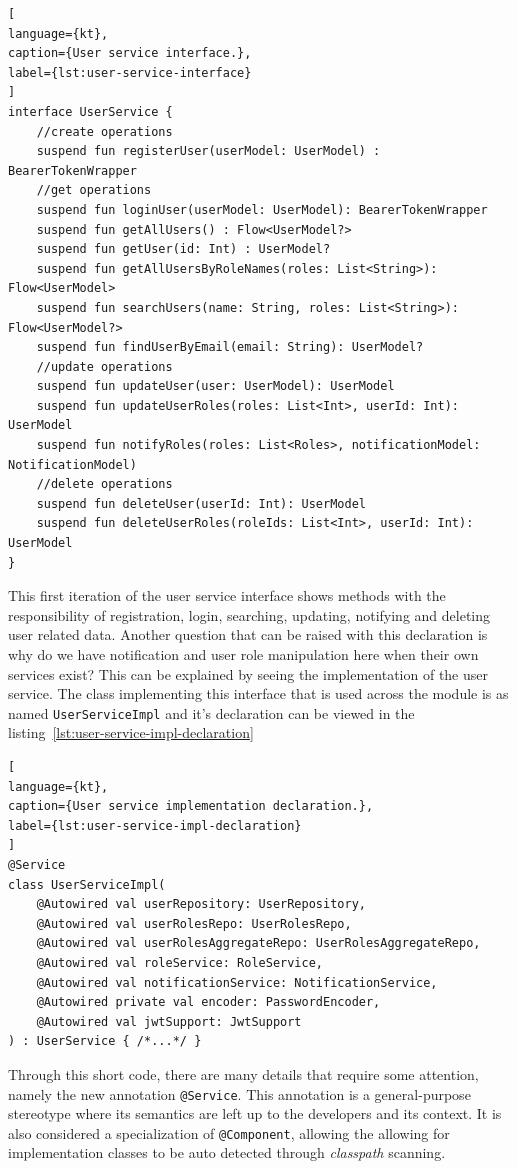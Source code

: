 \begin{lstlisting}[
language={kt},
caption={User service interface.},
label={lst:user-service-interface}
]
interface UserService {
    //create operations
    suspend fun registerUser(userModel: UserModel) : BearerTokenWrapper
    //get operations
    suspend fun loginUser(userModel: UserModel): BearerTokenWrapper
    suspend fun getAllUsers() : Flow<UserModel?>
    suspend fun getUser(id: Int) : UserModel?
    suspend fun getAllUsersByRoleNames(roles: List<String>): Flow<UserModel>
    suspend fun searchUsers(name: String, roles: List<String>): Flow<UserModel?>
    suspend fun findUserByEmail(email: String): UserModel?
    //update operations
    suspend fun updateUser(user: UserModel): UserModel
    suspend fun updateUserRoles(roles: List<Int>, userId: Int): UserModel
    suspend fun notifyRoles(roles: List<Roles>, notificationModel: NotificationModel)
    //delete operations
    suspend fun deleteUser(userId: Int): UserModel
    suspend fun deleteUserRoles(roleIds: List<Int>, userId: Int): UserModel
}
\end{lstlisting}

This first iteration of the user service interface shows methods with the responsibility of registration, login, searching, updating, notifying and deleting user related data.
Another question that can be raised with this declaration is why do we have notification and user role manipulation here when their own services exist? This can be explained by seeing the implementation of the user service. The class implementing this interface that is used across the module is as named \lstinline{UserServiceImpl} and it's declaration can be viewed in the listing~\ref{lst:user-service-impl-declaration}

\begin{lstlisting}[
language={kt},
caption={User service implementation declaration.},
label={lst:user-service-impl-declaration}
]
@Service
class UserServiceImpl(
    @Autowired val userRepository: UserRepository,
    @Autowired val userRolesRepo: UserRolesRepo,
    @Autowired val userRolesAggregateRepo: UserRolesAggregateRepo,
    @Autowired val roleService: RoleService,
    @Autowired val notificationService: NotificationService,
    @Autowired private val encoder: PasswordEncoder,
    @Autowired val jwtSupport: JwtSupport
) : UserService { /*...*/ }
\end{lstlisting}

Through this short code, there are many details that require some attention, namely the new annotation \lstinline{@Service}. This annotation is a general-purpose stereotype where its semantics are left up to the developers and its context. It is also considered a specialization of \lstinline{@Component}, allowing the allowing for implementation classes to be auto detected through \textit{classpath} scanning. 

